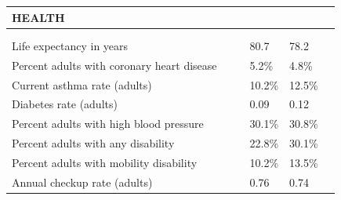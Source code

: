 \documentclass[9pt]{report}
\begin{document}
\newpage
\setlength{\tabcolsep}{.01in} %
\begin{tabular}{p{.10in}p{.10in}p{.10in}p{3.7in}>{\hfill}p{.85in}>{\hfill}p{.85in}>{\hfill}p{.85in}>{\hfill}p{.85in}p{0.1in}}
\multicolumn{9}{l}{\parbox{7.1in}{\raggedright{\large{\strut\textbf{HEALTH}\strut}}}} \\ 
\hline
\multicolumn{4}{l}{\parbox{3.5in}{\raggedright{\textbf{}}}} & \multicolumn{1}{r}{\parbox{.85in}{\strut\raggedleft{\textbf{}\strut}}} & \multicolumn{1}{r}{\parbox{.85in}{\strut\raggedleft{\textbf{}\strut}}} & \multicolumn{1}{r}{\parbox{.85in}{\strut{}}} & \multicolumn{1}{r}{\parbox{.85in}{\strut{}}} & \\ 
\multicolumn{9}{l}{} \\ 
\multicolumn{4}{l}{\parbox{3.6in}{\strut\raggedright{{Life expectancy in years}}\strut}} &  &  & 80.7 & 78.2 & \multicolumn{1}{l}{}  \\ 
\multicolumn{4}{l}{\parbox{3.6in}{\strut\raggedright{{Percent adults with coronary heart disease}}\strut}} &  &  & 5.2\% & 4.8\% & \multicolumn{1}{l}{}  \\ 
\multicolumn{4}{l}{\parbox{3.6in}{\strut\raggedright{{Current asthma rate (adults)}}\strut}} &  &  & 10.2\% & 12.5\% & \multicolumn{1}{l}{}  \\ 
\multicolumn{4}{l}{\parbox{3.6in}{\strut\raggedright{{Diabetes rate (adults)}}\strut}} &  &  & 0.09 & 0.12 & \multicolumn{1}{l}{}  \\ 
\multicolumn{4}{l}{\parbox{3.6in}{\strut\raggedright{{Percent adults with high blood pressure}}\strut}} &  &  & 30.1\% & 30.8\% & \multicolumn{1}{l}{}  \\ 
\multicolumn{4}{l}{\parbox{3.6in}{\strut\raggedright{{Percent adults with any disability}}\strut}} &  &  & 22.8\% & 30.1\% & \multicolumn{1}{l}{}  \\ 
\multicolumn{4}{l}{\parbox{3.6in}{\strut\raggedright{{Percent adults with mobility disability}}\strut}} &  &  & 10.2\% & 13.5\% & \multicolumn{1}{l}{}  \\ 
\multicolumn{4}{l}{\parbox{3.6in}{\strut\raggedright{{Annual checkup rate (adults)}}\strut}} &  &  & 0.76 & 0.74 & \multicolumn{1}{l}{}  \\ 

\end{tabular}
\end{document}
